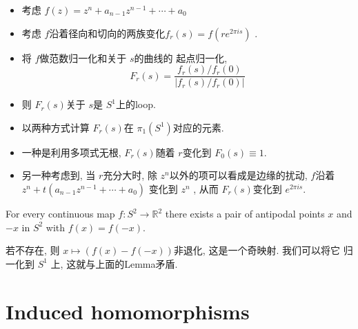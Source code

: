 \documentclass[../main.tex]{subfiles}
\begin{document}
\begin{proofsketch}
    \begin{itemize}
        \item 考虑 \(  f\left( z \right)= z^{n}+ a_{n-1}z^{n-1}+ \cdots + a_0   \) 
        \item 考虑 \(  f  \)沿着径向和切向的两族变化\(  f_{r}\left( s \right)= f\left( re^{2 \pi is} \right)    \) .
        \item 将 \(  f  \)做范数归一化和关于 \(  s  \)的曲线的 起点归一化,   \[
       F_{r}\left( s \right)=   \frac{f_{r}\left( s \right)/ f_{r}\left( 0 \right)   }{\left| f_{r}\left( s \right)/ f_{r}\left( 0 \right)   \right|  } 
        \]
        \item 则 \(  F_{r}\left( s \right)   \)关于 \(  s  \)是 \(  S^{1}  \)上的loop.   
        \item 以两种方式计算 \(  F_{r}\left( s \right)   \)在 \(   \pi _1 \left( S^{1} \right)   \)对应的元素.
        \item 一种是利用多项式无根, \(  F_{r}\left( s \right)   \)随着 \(  r  \)变化到 \(  F_{0}\left( s \right)\equiv 1   \).      
        \item 另一种考虑到, 当 \(  r  \)充分大时, 除 \(  z^{n}  \)以外的项可以看成是边缘的扰动, \( f  \)沿着 \(  z^{n}+ t\left( a_{n-1}z^{n-1}+ \cdots + a_0 \right)   \)  变化到 \(  z^{n}  \) , 从而 \(  F_{r}\left( s \right)   \)变化到 \(  e^{2 \pi is}  \).  
    \end{itemize}
    
\end{proofsketch}

\begin{theorem}{}{}
For every continuous map $f:S^{2}\to\mathbb{R}^{2}$ there exists a pair of antipodal points $x$ and $-x$ in $S^{2}$ with $f(x)=f(-x)$.
\end{theorem}
\begin{proofsketch}
    若不存在, 则 \(  x\mapsto \left( f\left( x \right)-f\left( -x \right)   \right)   \)非退化, 这是一个奇映射. 我们可以将它 归一化到 \(  S^{1}  \) 上, 这就与上面的Lemma矛盾. 
\end{proofsketch}

\section{Induced homomorphisms}
\end{document}
